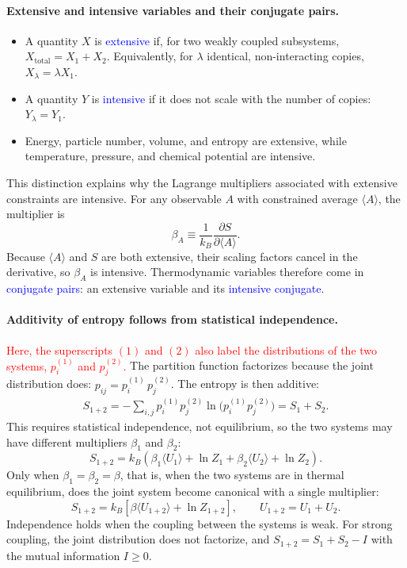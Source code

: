 \paragraph{Extensive and intensive variables and their conjugate pairs.}
\begin{itemize}
    \item A quantity $X$ is \textcolor{blue}{extensive} if, for two weakly
    coupled subsystems, $X_{\mathrm{total}}=X_1+X_2$. Equivalently, for
    $\lambda$ identical, non-interacting copies, $X_\lambda=\lambda X_1$.
    \item A quantity $Y$ is \textcolor{blue}{intensive} if it does not scale
    with the number of copies: $Y_\lambda=Y_1$.
    \item Energy, particle number, volume, and entropy are extensive, while
    temperature, pressure, and chemical potential are intensive.
\end{itemize}
This distinction explains why the Lagrange multipliers associated with
extensive constraints are intensive. For any observable $A$ with constrained
average $\langle A\rangle$, the multiplier is
\begin{equation*}
    \beta_A\equiv\frac{1}{k_B}\frac{\partial S}{\partial\langle A\rangle}.
\end{equation*}
Because $\langle A\rangle$ and $S$ are both extensive, their scaling factors
cancel in the derivative, so $\beta_A$ is intensive. Thermodynamic variables
therefore come in \textcolor{blue}{conjugate pairs}: an extensive variable
and its \textcolor{blue}{intensive conjugate}.

\paragraph{Additivity of entropy follows from statistical independence.}
\textcolor{red}{Here, the superscripts $(1)$ and $(2)$ also label the
distributions of the two systems, $p^{(1)}_i$ and $p^{(2)}_j$.}
The partition function factorizes because the joint distribution does:
$p_{ij}=p^{(1)}_i\,p^{(2)}_j$. The entropy is then additive:
\begin{align*}
    S_{1+2}
    = -\sum_{i,j} p^{(1)}_i p^{(2)}_j
    \ln\!\big(p^{(1)}_i p^{(2)}_j\big)
    = S_1+S_2.
\end{align*}
This requires statistical independence, not equilibrium, so the two systems
may have different multipliers $\beta_1$ and $\beta_2$:
\begin{equation}
    \boxed{S_{1+2}=k_B\left(\beta_1\langle U_1\rangle+\ln Z_1
    +\beta_2\langle U_2\rangle+\ln Z_2\right).}
\end{equation}
Only when $\beta_1=\beta_2=\beta$, that is, when the two systems are in
thermal equilibrium, does the joint system become canonical with a single
multiplier:
\begin{equation}
    \boxed{S_{1+2}=k_B\left[\beta\langle U_{1+2}\rangle+\ln Z_{1+2}\right],
    \qquad U_{1+2}=U_1+U_2.}
\end{equation}
Independence holds when the coupling between the systems is weak. For strong
coupling, the joint distribution does not factorize, and
$S_{1+2}=S_1+S_2-I$ with the mutual information $I\geq0$.

